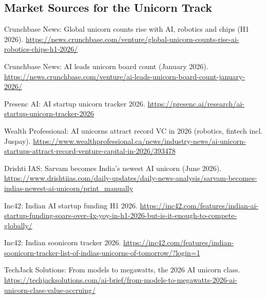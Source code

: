 \documentclass[10pt,a4paper]{article}
\begin{document}
\subsection*{Market Sources for the Unicorn Track}{\scriptsize\begin{enumerate}[label={[\arabic*]},itemsep=0pt]
\item Crunchbase News: Global unicorn counts rise with AI, robotics and chips (H1 2026). \url{https://news.crunchbase.com/venture/global-unicorn-counts-rise-ai-robotics-chips-h1-2026/}
\item Crunchbase News: AI leads unicorn board count (January 2026). \url{https://news.crunchbase.com/venture/ai-leads-unicorn-board-count-january-2026/}
\item Presenc AI: AI startup unicorn tracker 2026. \url{https://presenc.ai/research/ai-startup-unicorn-tracker-2026}
\item Wealth Professional: AI unicorns attract record VC in 2026 (robotics, fintech incl. Juspay). \url{https://www.wealthprofessional.ca/news/industry-news/ai-unicorn-startups-attract-record-venture-capital-in-2026/393478}
\item Drishti IAS: Sarvam becomes India's newest AI unicorn (June 2026). \url{https://www.drishtiias.com/daily-updates/daily-news-analysis/sarvam-becomes-indias-newest-ai-unicorn/print_manually}
\item Inc42: Indian AI startup funding H1 2026. \url{https://inc42.com/features/indian-ai-startup-funding-soars-over-4x-yoy-in-h1-2026-but-is-it-enough-to-compete-globally/}
\item Inc42: Indian soonicorn tracker 2026. \url{https://inc42.com/features/indian-soonicorn-tracker-list-of-indias-unicorns-of-tomorrow/?login=1}
\item TechJack Solutions: From models to megawatts, the 2026 AI unicorn class. \url{https://techjacksolutions.com/ai-brief/from-models-to-megawatts-2026-ai-unicorn-class-value-accruing/}
\end{enumerate}}
\newpage\thispagestyle{empty}
\end{document}
